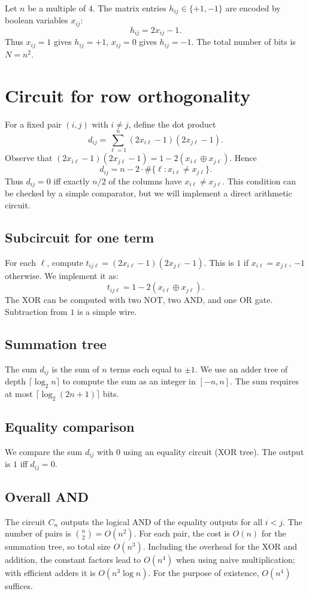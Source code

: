 \documentclass[11pt,a4paper]{article}
\begin{document}
Let $n$ be a multiple of $4$. The matrix entries $h_{ij}\in\{+1,-1\}$ are encoded by boolean variables $x_{ij}$:
\[
h_{ij} = 2x_{ij} - 1.
\]
Thus $x_{ij}=1$ gives $h_{ij}=+1$, $x_{ij}=0$ gives $h_{ij}=-1$. The total number of bits is $N=n^2$.

\section{Circuit for row orthogonality}

For a fixed pair $(i,j)$ with $i\neq j$, define the dot product
\[
d_{ij} = \sum_{\ell=1}^n (2x_{i\ell}-1)(2x_{j\ell}-1).
\]
Observe that $(2x_{i\ell}-1)(2x_{j\ell}-1) = 1 - 2(x_{i\ell} \oplus x_{j\ell})$. Hence
\[
d_{ij} = n - 2\cdot\#\{\ell : x_{i\ell} \neq x_{j\ell}\}.
\]
Thus $d_{ij}=0$ iff exactly $n/2$ of the columns have $x_{i\ell}\neq x_{j\ell}$. This condition can be checked by a simple comparator, but we will implement a direct arithmetic circuit.

\subsection{Subcircuit for one term}
For each $\ell$, compute $t_{ij\ell} = (2x_{i\ell}-1)(2x_{j\ell}-1)$. This is $1$ if $x_{i\ell}=x_{j\ell}$, $-1$ otherwise. We implement it as:
\[
t_{ij\ell} = 1 - 2(x_{i\ell} \oplus x_{j\ell}).
\]
The XOR can be computed with two NOT, two AND, and one OR gate. Subtraction from $1$ is a simple wire.

\subsection{Summation tree}
The sum $d_{ij}$ is the sum of $n$ terms each equal to $\pm1$. We use an adder tree of depth $\lceil \log_2 n\rceil$ to compute the sum as an integer in $[-n,n]$. The sum requires at most $\lceil \log_2(2n+1)\rceil$ bits.

\subsection{Equality comparison}
We compare the sum $d_{ij}$ with $0$ using an equality circuit (XOR tree). The output is $1$ iff $d_{ij}=0$.

\subsection{Overall AND}
The circuit $C_n$ outputs the logical AND of the equality outputs for all $i<j$. The number of pairs is $\binom{n}{2}=O(n^2)$. For each pair, the cost is $O(n)$ for the summation tree, so total size $O(n^3)$. Including the overhead for the XOR and addition, the constant factors lead to $O(n^4)$ when using naive multiplication; with efficient adders it is $O(n^3\log n)$. For the purpose of existence, $O(n^4)$ suffices.
\end{document}
